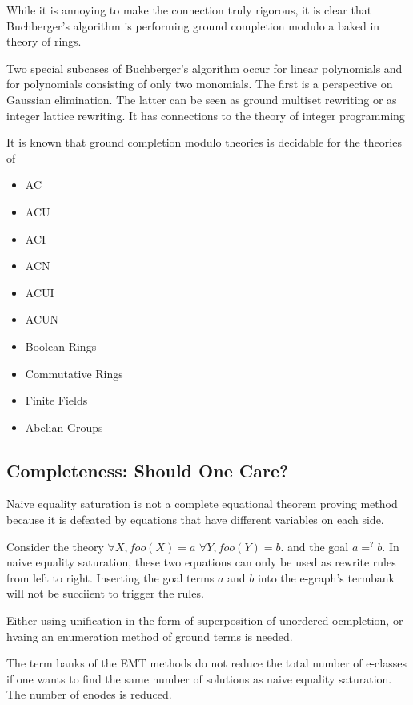 While it is annoying to make the connection truly rigorous, it is clear that Buchberger's algorithm is performing ground completion modulo a baked in theory of rings.

Two special subcases of Buchberger's algorithm occur for linear polynomials and for polynomials consisting of only two monomials.
The first is a perspective on Gaussian elimination. The latter can be seen as ground multiset rewriting or as integer lattice rewriting. It has connections to the theory of integer programming \cite{sturmfels1996grobner}

It is known that ground completion modulo theories is decidable for the theories of \cite{MARCHE1996253}

\begin{itemize}
\item AC
\item ACU
\item ACI
\item ACN
\item ACUI
\item ACUN
\item Boolean Rings
\item Commutative Rings
\item Finite Fields
\item Abelian Groups
\end{itemize}


\subsection{Completeness: Should One Care?}

Naive equality saturation is not a complete equational theorem proving method because it is defeated by equations that have different variables on each side. \cite{remybirkhoff}

Consider the theory $\forall X, foo(X) = a$  $\forall Y, foo(Y) = b$. and the goal $a =^? b$. 
In naive equality saturation, these two equations can only be used as rewrite rules from left to right. Inserting the goal terms $a$ and $b$ into the e-graph's termbank will not be succiient to trigger the rules.

Either using unification in the form of superposition of unordered ocmpletion, or hvaing an enumeration method of ground terms is needed. \cite{GeMoura2009}

The term banks of the EMT methods do not reduce the total number of e-classes if one wants to find the same number of solutions as naive equality saturation. The number of enodes is reduced.

